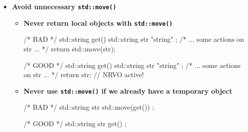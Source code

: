 \documentclass[../main]{subfiles}
\begin{document}
\begin{itemize}
\begin{Code}
{            std::string m_str;
            std::vector<int> m_vec;
        };
        
        int main()
        {
            /* "string" is const char* object, so will be copied to str,
             * and then moved m_str;
             * {1, 2, 3} is an initializer list which creates
             * a new vector vec but moved to m_vec;
             */
            Data data { "string", {1, 2, 3} };
        
            return 0;
        }
    \end{Code}
    \noindent
    To summarize it - if there is no important reason, \textbf{we shouldn't use the constructor with simple \texttt{const \&} parameter type}.
    One of the special cases may be \texttt{std::array} which hasn't cheap move semantics implemented or if we already have a value and we
    want just to modify it within a class.
    \item \textbf{Avoid unnecessary \texttt{std::move()}}
    \begin{itemize}
        \item \textbf{Never return local objects with \texttt{std::move()}}
        \begin{Code}
            /* BAD */
            std::string get()
            {
                std::string str { "string" };
                /* ... some actions on str ... */
                return std::move(str);
            }

            /* GOOD */
            std::string get()
            {
                std::string str { "string" };
                /* ... some actions on str ... */
                return str; // NRVO active!
            }
        \end{Code}
        \item \textbf{Never use \texttt{std::move()} if we already have a temporary object}
        \begin{Code}
            /* BAD */
            std::string str { std::move(get()) };

            /* GOOD */
            std::string str { get() };
        \end{Code}
    \end{itemize}
\end{itemize}
\end{document}

